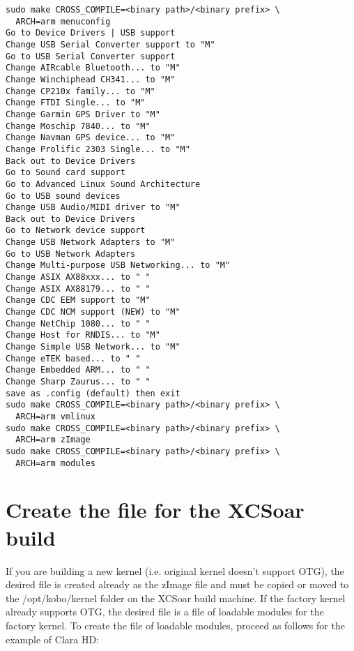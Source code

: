 \begin{verbatim}
sudo make CROSS_COMPILE=<binary path>/<binary prefix> \
  ARCH=arm menuconfig
Go to Device Drivers | USB support
Change USB Serial Converter support to "M"
Go to USB Serial Converter support
Change AIRcable Bluetooth... to "M"
Change Winchiphead CH341... to "M"
Change CP210x family... to "M"
Change FTDI Single... to "M"
Change Garmin GPS Driver to "M"
Change Moschip 7840... to "M"
Change Navman GPS device... to "M"
Change Prolific 2303 Single... to "M"
Back out to Device Drivers
Go to Sound card support
Go to Advanced Linux Sound Architecture
Go to USB sound devices
Change USB Audio/MIDI driver to "M"
Back out to Device Drivers
Go to Network device support
Change USB Network Adapters to "M"
Go to USB Network Adapters
Change Multi-purpose USB Networking... to "M"
Change ASIX AX88xxx... to " "
Change ASIX AX88179... to " "
Change CDC EEM support to "M"
Change CDC NCM support (NEW) to "M"
Change NetChip 1080... to " "
Change Host for RNDIS... to "M"
Change Simple USB Network... to "M"
Change eTEK based... to " "
Change Embedded ARM... to " "
Change Sharp Zaurus... to " "
save as .config (default) then exit
sudo make CROSS_COMPILE=<binary path>/<binary prefix> \
  ARCH=arm vmlinux
sudo make CROSS_COMPILE=<binary path>/<binary prefix> \
  ARCH=arm zImage
sudo make CROSS_COMPILE=<binary path>/<binary prefix> \
  ARCH=arm modules
\end{verbatim}

\section{Create the file for the XCSoar build}

If you are building a new kernel (i.e. original kernel doesn't support OTG), the desired
file is created already as the zImage file and must be copied or moved to the
/opt/kobo/kernel folder on the XCSoar build machine.  If the factory kernel already
supports OTG, the desired file is a file of loadable modules for the factory kernel.
To create the file of loadable modules, proceed as follows for the example of Clara HD:

